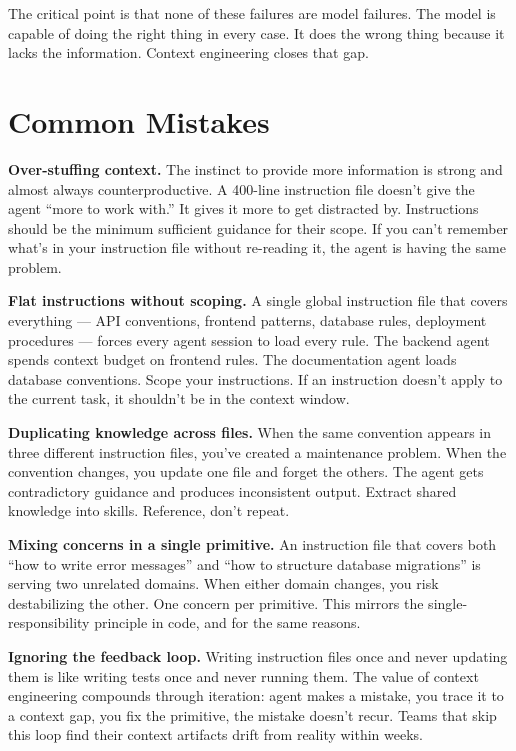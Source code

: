 \documentclass[
  a4paper,
  DIV=11,
  numbers=noendperiod]{scrreprt}
\newcounter{none} %
\begin{document}
The critical point is that none of these failures are model failures.
The model is capable of doing the right thing in every case. It does the
wrong thing because it lacks the information. Context engineering closes
that gap.

\section{Common Mistakes}\label{common-mistakes}

\textbf{Over-stuffing context.} The instinct to provide more information
is strong and almost always counterproductive. A 400-line instruction
file doesn't give the agent ``more to work with.'' It gives it more to
get distracted by. Instructions should be the minimum sufficient
guidance for their scope. If you can't remember what's in your
instruction file without re-reading it, the agent is having the same
problem.

\textbf{Flat instructions without scoping.} A single global instruction
file that covers everything --- API conventions, frontend patterns,
database rules, deployment procedures --- forces every agent session to
load every rule. The backend agent spends context budget on frontend
rules. The documentation agent loads database conventions. Scope your
instructions. If an instruction doesn't apply to the current task, it
shouldn't be in the context window.

\textbf{Duplicating knowledge across files.} When the same convention
appears in three different instruction files, you've created a
maintenance problem. When the convention changes, you update one file
and forget the others. The agent gets contradictory guidance and
produces inconsistent output. Extract shared knowledge into skills.
Reference, don't repeat.

\textbf{Mixing concerns in a single primitive.} An instruction file that
covers both ``how to write error messages'' and ``how to structure
database migrations'' is serving two unrelated domains. When either
domain changes, you risk destabilizing the other. One concern per
primitive. This mirrors the single-responsibility principle in code, and
for the same reasons.

\textbf{Ignoring the feedback loop.} Writing instruction files once and
never updating them is like writing tests once and never running them.
The value of context engineering compounds through iteration: agent
makes a mistake, you trace it to a context gap, you fix the primitive,
the mistake doesn't recur. Teams that skip this loop find their context
artifacts drift from reality within weeks.
\end{document}
